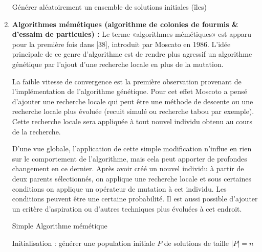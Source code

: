 \begin{enumerate}[label=\alph*)]
\begin{algorithm}[H]
Générer aléatoirement un ensemble de solutions initiales (îles) \;

\end{algorithm}
	
	\item \textbf{Algorithmes mémétiques (algorithme de colonies de fourmis \& d’essaim de particules) : }
Le terme «algorithmes mémétiques»  est apparu pour la première fois dans [38], introduit par Moscato en 1986. L’idée principale de ce genre d’algorithme est de rendre plus agressif un algorithme génétique par l’ajout d’une recherche locale en plus de la mutation.

La faible vitesse de convergence est la première observation provenant de l’implémentation de l’algorithme génétique. Pour cet effet Moscoto a pensé d’ajouter une recherche locale  qui peut être une méthode de descente ou une recherche locale plus évoluée (recuit simulé ou recherche tabou par exemple). Cette recherche locale sera appliquée à tout nouvel individu obtenu au cours de la recherche.

D’une vue globale, l’application de cette simple modification n’influe en rien sur le comportement de l’algorithme, mais  cela peut apporter de profondes changement en ce dernier. Après avoir créé un nouvel individu à partir de deux parents sélectionnés, on applique une recherche locale et sous certaines conditions on applique un opérateur de mutation à cet individu. Les conditions peuvent être une certaine probabilité. Il est aussi possible d’ajouter un critère d’aspiration ou d’autres techniques plus évoluées à cet endroit.\\


\begin{algorithm}[H]
\caption{Simple Algorithme mémétique}
\SetAlgoLined
\DontPrintSemicolon

Initialisation : générer une population initiale $P$ de solutions de taille $| P | = n$  \;


\end{algorithm}
\end{enumerate}
